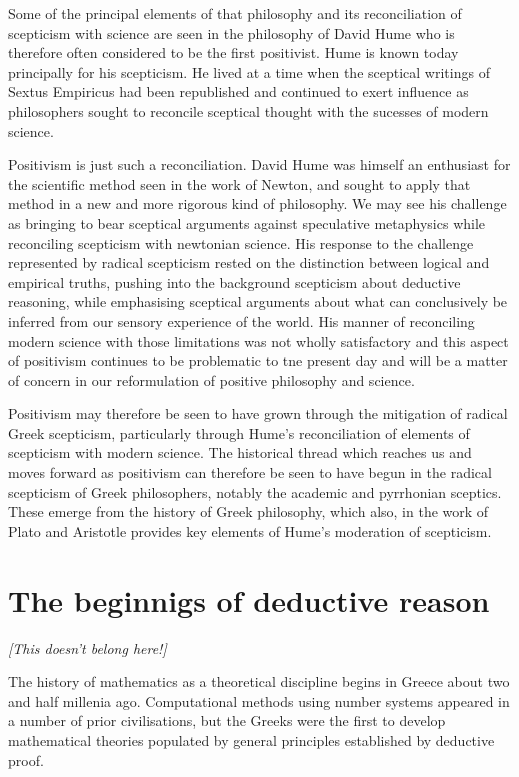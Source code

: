 Some of the principal elements of that philosophy and its reconciliation of scepticism with science
are seen in the philosophy of David Hume who is therefore often considered to be the first positivist.
Hume is known today principally for his scepticism.
He lived at a time when the sceptical writings of Sextus Empiricus had been republished
and continued to exert influence as philosophers sought to reconcile sceptical thought
with the sucesses of modern science.

Positivism is just such a reconciliation.
David Hume was himself an enthusiast for the scientific method seen in the work of Newton,
and sought to apply that method in a new and more rigorous kind of philosophy.
We may see his challenge as bringing to bear sceptical arguments against speculative
metaphysics while reconciling scepticism with newtonian science.
His response to the challenge represented by radical scepticism rested on the distinction between logical and empirical truths,
pushing into the background scepticism about deductive reasoning, while emphasising sceptical
arguments about what can conclusively be inferred from our sensory experience of the world.
His manner of reconciling modern science with those limitations was not wholly satisfactory
and this aspect of positivism continues to be problematic to tne present day and will be
a matter of concern in our reformulation of positive philosophy and science.

Positivism may therefore be seen to have grown through the mitigation of radical
Greek scepticism, particularly through Hume's reconciliation of elements of scepticism
with modern science.
The historical thread which reaches us and moves forward as positivism can
therefore be seen to have begun in the radical scepticism of Greek philosophers,
notably the academic and pyrrhonian sceptics.
These emerge from the history of Greek philosophy, which also, in the work
of Plato and Aristotle provides key elements of Hume's moderation of scepticism.

\section{The beginnigs of deductive reason}

\emph{[This doesn't belong here!]}

The history of mathematics as a theoretical discipline begins in Greece about two and half millenia ago.
Computational methods using number systems appeared in a number of prior civilisations,
but the Greeks were the first to develop mathematical theories populated by general principles
established by deductive proof.

